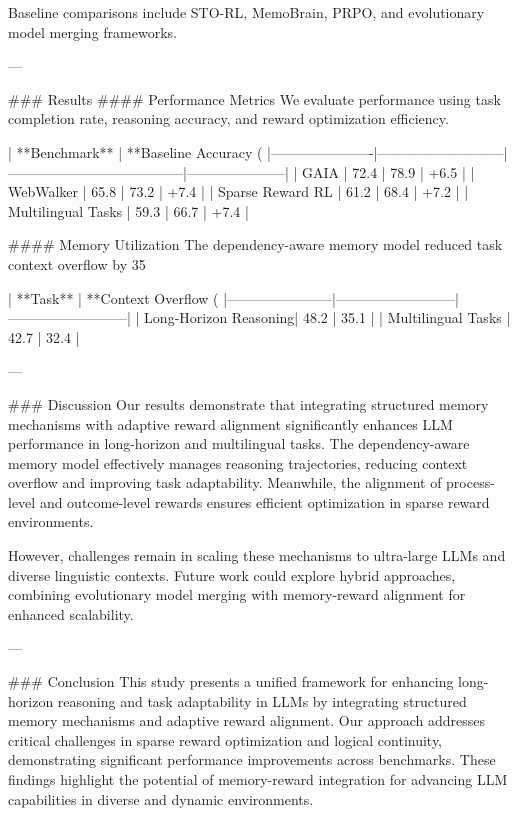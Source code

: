 Baseline comparisons include STO-RL, MemoBrain, PRPO, and evolutionary model merging frameworks.

---

### Results
#### Performance Metrics
We evaluate performance using task completion rate, reasoning accuracy, and reward optimization efficiency.

| **Benchmark**       | **Baseline Accuracy (%
|----------------------|---------------------------|--------------------------------------|---------------------|
| GAIA                | 72.4                      | 78.9                                 | +6.5                |
| WebWalker           | 65.8                      | 73.2                                 | +7.4                |
| Sparse Reward RL    | 61.2                      | 68.4                                 | +7.2                |
| Multilingual Tasks  | 59.3                      | 66.7                                 | +7.4                |

#### Memory Utilization
The dependency-aware memory model reduced task context overflow by 35%

| **Task**              | **Context Overflow (%
|-----------------------|--------------------------|--------------------------|
| Long-Horizon Reasoning| 48.2                     | 35.1                     |
| Multilingual Tasks    | 42.7                     | 32.4                     |

---

### Discussion
Our results demonstrate that integrating structured memory mechanisms with adaptive reward alignment significantly enhances LLM performance in long-horizon and multilingual tasks. The dependency-aware memory model effectively manages reasoning trajectories, reducing context overflow and improving task adaptability. Meanwhile, the alignment of process-level and outcome-level rewards ensures efficient optimization in sparse reward environments.

However, challenges remain in scaling these mechanisms to ultra-large LLMs and diverse linguistic contexts. Future work could explore hybrid approaches, combining evolutionary model merging with memory-reward alignment for enhanced scalability.

---

### Conclusion
This study presents a unified framework for enhancing long-horizon reasoning and task adaptability in LLMs by integrating structured memory mechanisms and adaptive reward alignment. Our approach addresses critical challenges in sparse reward optimization and logical continuity, demonstrating significant performance improvements across benchmarks. These findings highlight the potential of memory-reward integration for advancing LLM capabilities in diverse and dynamic environments.


